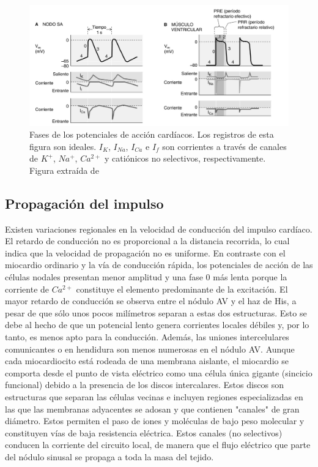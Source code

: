     \begin{figure}[H]
        \centering
        \includegraphics[scale=0.45]{sections/chapter-02/images/action_potential_phases.png}
        \caption[Fases de los potenciales de acción cardíacos.]{Fases de los potenciales de acción cardíacos. Los
        registros de esta figura son ideales. $I_K$, $I_{Na}$, $I_{Ca}$ e $I_f$ son corrientes a través de canales
        de $K^+$, $Na^+$, $Ca^{2+}$ y catiónicos no selectivos, respectivamente. Figura extraída de \cite{bk:boron3ed}}
        \label{fig:action_potential_phases}
    \end{figure}
    
    \subsection{Propagación del impulso}
    
    \indent Existen variaciones regionales en la velocidad de conducción del impulso cardíaco. \\
    \indent El retardo de conducción no es proporcional a la distancia recorrida, lo cual indica que la velocidad de
propagación no es uniforme. En contraste con el miocardio ordinario y la vía de conducción rápida, los potenciales
de acción de las células nodales presentan menor amplitud y una fase 0 más lenta porque la corriente de $Ca^{2+}$
constituye el elemento predominante de la excitación. El mayor retardo de conducción se observa entre el nódulo AV y
el haz de His, a pesar de que sólo unos pocos milímetros separan a estas dos estructuras. Esto se debe al hecho de
que un potencial lento genera corrientes locales débiles y, por lo tanto, es menos apto para la conducción. Además,
las uniones intercelulares comunicantes o en hendidura son menos numerosas en el nódulo AV. Aunque cada
miocardiocito está rodeada de una membrana aislante, el miocardio se comporta desde el punto de vista eléctrico como
una célula única gigante (sincicio funcional) debido a la presencia de los discos intercalares. Estos discos son
estructuras que separan las células vecinas e incluyen regiones especializadas en las que las membranas adyacentes
se adosan y que contienen "canales" de gran diámetro. Estos permiten el paso de iones y moléculas de bajo peso
molecular y constituyen vías de baja resistencia eléctrica. Estos canales (no selectivos) conducen la corriente del
circuito local, de manera que el flujo eléctrico que parte del nódulo sinusal se propaga a toda la masa del tejido.

